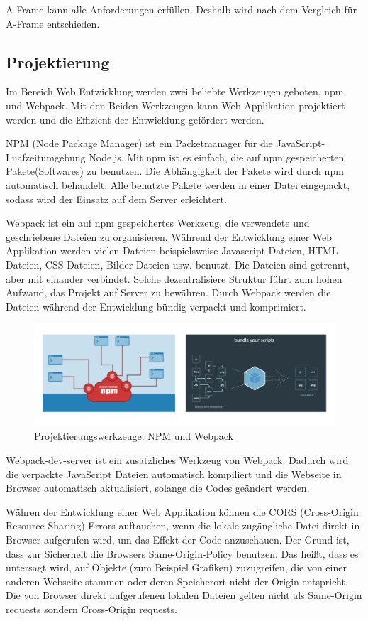  A-Frame kann alle Anforderungen erfüllen. Deshalb wird nach dem Vergleich für A-Frame entschieden.
 
 \subsection{Projektierung}
 Im Bereich Web Entwicklung werden zwei beliebte Werkzeugen geboten, npm und Webpack. Mit den Beiden Werkzeugen kann Web Applikation projektiert werden und die Effizient der Entwicklung gefördert werden.
 
 NPM (Node Package Manager) ist ein Packetmanager für die JavaScript-Luafzeitumgebung Node.js. Mit npm ist es einfach, die auf npm gespeicherten Pakete(Softwares) zu benutzen. Die Abhängigkeit der Pakete wird durch npm automatisch behandelt. Alle benutzte Pakete werden in einer Datei eingepackt, sodass wird der Einsatz auf dem Server erleichtert.
 
 Webpack ist ein auf npm gespeichertes Werkzeug, die verwendete und geschriebene Dateien zu organisieren. Während der Entwicklung einer Web Applikation werden vielen Dateien beispielsweise Javascript Dateien, HTML Dateien, CSS Dateien, Bilder Dateien usw. benutzt. Die Dateien sind getrennt, aber mit einander verbindet. Solche dezentralisiere Struktur führt zum hohen Aufwand, das Projekt auf Server zu bewähren. Durch Webpack werden die Dateien während der Entwicklung bündig verpackt und komprimiert.
 
\begin{figure}[ht]
\centering
\includegraphics[width=\textwidth]{images/npmWebpack.png}
\caption[Projektierungswerkzeuge]{Projektierungswerkzeuge: NPM und Webpack}
\label{fig:npm Webpack}
\end{figure}
 
 Webpack-dev-server ist ein zusätzliches Werkzeug von Webpack. Dadurch wird die verpackte JavaScript Dateien automatisch kompiliert und die Webseite in Browser automatisch aktualisiert, solange die Codes geändert werden.
 
 Währen der Entwicklung einer Web Applikation können die CORS (Cross-Origin Resource Sharing) Errors auftauchen, wenn die lokale zugängliche Datei direkt in Browser aufgerufen wird, um das Effekt der Code anzuschauen. Der Grund ist, dass zur Sicherheit die Browsers Same-Origin-Policy benutzen. Das heißt, dass es untersagt wird, auf Objekte (zum Beispiel Grafiken) zuzugreifen, die von einer anderen Webseite stammen oder deren Speicherort nicht der Origin entspricht. Die von Browser direkt aufgerufenen lokalen Dateien gelten nicht als Same-Origin requests sondern Cross-Origin requests.
 
